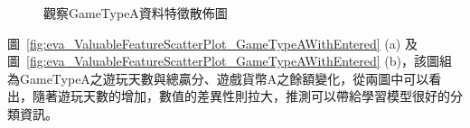 \begin{figure}[!htb]
    \centering
    \caption[觀察GameTypeA資料特徵散佈圖]{觀察GameTypeA資料特徵散佈圖}
    \label{fig:eva_ValuableFeatureScatterPlot_GameTypeA}
\end{figure}
\newpage

圖~\ref{fig:eva_ValuableFeatureScatterPlot_GameTypeAWithEntered} (a) 及圖~\ref{fig:eva_ValuableFeatureScatterPlot_GameTypeAWithEntered} (b)，該圖組為GameTypeA之遊玩天數與總贏分、遊戲貨幣A之餘額變化，從兩圖中可以看出，隨著遊玩天數的增加，數值的差異性則拉大，推測可以帶給學習模型很好的分類資訊。


